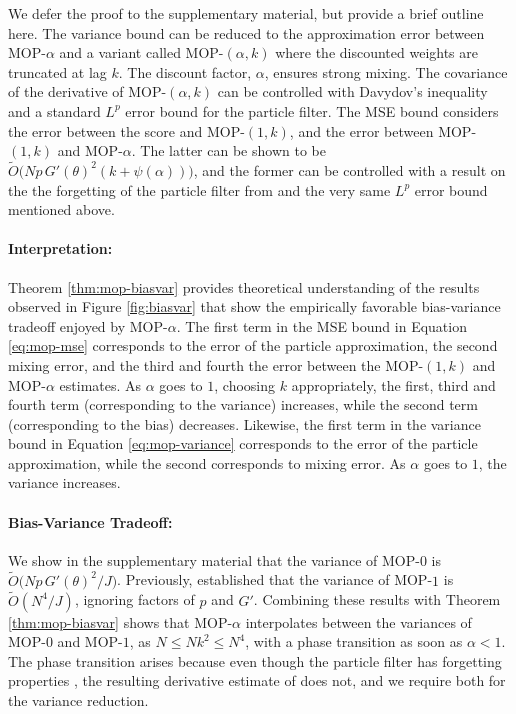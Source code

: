 \documentclass[9pt,twocolumn,pnasresearcharticle]{pnas-new}
\newcommand\arxiv[2]{#2} %
\begin{document}
We defer the proof to \arxiv{Appendix~\ref{appendix:biasvar}}{the supplementary material}, but provide a brief outline here. 
The variance bound can be reduced to the approximation error between MOP-$\alpha$ and a variant called MOP-$(\alpha,k)$ where the discounted weights are truncated at lag $k$. 
The discount factor, $\alpha$, ensures strong mixing.
The covariance of the derivative of MOP-$(\alpha,k)$ can be controlled with Davydov's inequality and a standard $L^p$ error bound for the particle filter. 
The MSE bound considers the error between the score and MOP-$(1,k)$, and the error between MOP-$(1,k)$ and MOP-$\alpha$. 
The latter can be shown to be $\tilde{O}\big(Np \, G'(\theta)^2(k+\psi(\alpha))\big)$, and the former can be controlled with a result on the the forgetting of the particle filter from \cite{karjalainen23} and the very same $L^p$ error bound mentioned above. 

\paragraph{Interpretation:} Theorem \ref{thm:mop-biasvar} provides theoretical understanding of the results observed in Figure \ref{fig:biasvar} that show the empirically favorable bias-variance tradeoff enjoyed by MOP-$\alpha$.
The first term in the MSE bound in Equation \ref{eq:mop-mse} corresponds to the error of the particle approximation, the second mixing error, and the third and fourth the error between the MOP-$(1,k)$ and MOP-$\alpha$ estimates. 
As $\alpha$ goes to $1$, choosing $k$ appropriately, the first, third and fourth term (corresponding to the variance) increases, while the second term (corresponding to the bias) decreases. 
Likewise, the first term in the variance bound in Equation \ref{eq:mop-variance} corresponds to the error of the particle approximation, while the second corresponds to mixing error. 
As $\alpha$ goes to $1$, the variance increases. 

\paragraph{Bias-Variance Tradeoff:} We show in \arxiv{Appendix~\ref{appendix:biasvar}}{the supplementary material} that the variance of MOP-$0$ is $\tilde{O}\big( Np \, G'(\theta)^2\big/J \big)$.
Previously, \cite{poyiadjis11} established that the variance of MOP-$1$ is $\tilde{O}(N^4/J)$, ignoring factors of $p$ and $G'$. 
Combining these results with Theorem \ref{thm:mop-biasvar} shows that MOP-$\alpha$ interpolates between the variances of MOP-$0$ and MOP-$1$, as $N \leq Nk^2 \leq N^4$, with a phase transition as soon as $\alpha<1$. 
The phase transition arises because even though the particle filter has forgetting properties \cite{karjalainen23}, the resulting derivative estimate of \cite{poyiadjis11} does not, and we require both for the variance reduction. 
\end{document}
